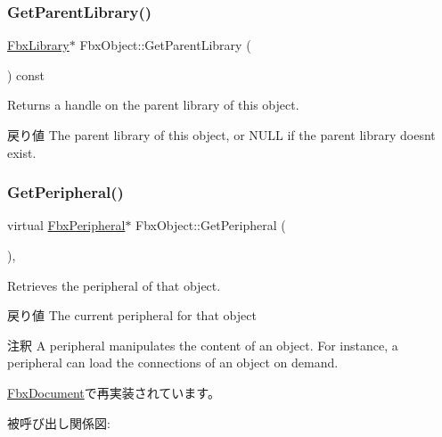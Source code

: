 \subsubsection{\texorpdfstring{Get\+Parent\+Library()}{GetParentLibrary()}}
{\footnotesize\ttfamily \hyperlink{class_fbx_library}{Fbx\+Library}$\ast$ Fbx\+Object\+::\+Get\+Parent\+Library (\begin{DoxyParamCaption}{ }\end{DoxyParamCaption}) const}

Returns a handle on the parent library of this object. \begin{DoxyReturn}{戻り値}
The parent library of this object, or {\ttfamily N\+U\+LL} if the parent library doesn\textquotesingle{}t exist. 
\end{DoxyReturn}
\mbox{\label{class_fbx_object_a7aef9083f559702547871bedbf0d6b5a}} 
\subsubsection{\texorpdfstring{Get\+Peripheral()}{GetPeripheral()}}
{\footnotesize\ttfamily virtual \hyperlink{class_fbx_peripheral}{Fbx\+Peripheral}$\ast$ Fbx\+Object\+::\+Get\+Peripheral (\begin{DoxyParamCaption}{ }\end{DoxyParamCaption})\hspace{0.3cm}{\ttfamily [protected]}, {\ttfamily [virtual]}}

Retrieves the peripheral of that object. \begin{DoxyReturn}{戻り値}
The current peripheral for that object 
\end{DoxyReturn}
\begin{DoxyRemark}{注釈}
A peripheral manipulates the content of an object. For instance, a peripheral can load the connections of an object on demand. 
\end{DoxyRemark}


\hyperlink{class_fbx_document_a83abd11e3c318ab4f20a23282626bb7d}{Fbx\+Document}で再実装されています。

被呼び出し関係図\+:
\mbox{\label{class_fbx_object_a779778f1761213ed413fa55c0b540d8e}} 
